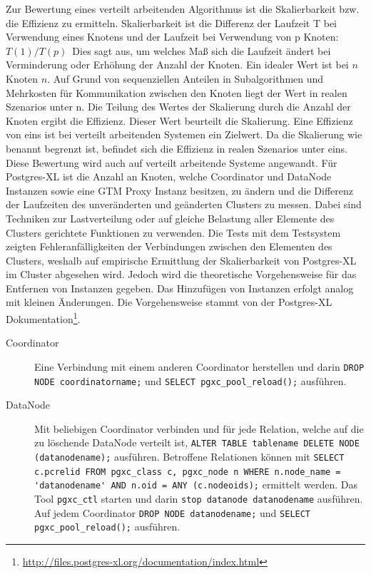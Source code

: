 Zur Bewertung eines verteilt arbeitenden Algorithmus ist die Skalierbarkeit bzw. die Effizienz zu ermitteln.
Skalierbarkeit ist die Differenz der Laufzeit T bei Verwendung eines Knotens und der Laufzeit bei Verwendung von p Knoten:
$T(1)/T(p)$\ 
Dies sagt aus, um welches Maß sich die Laufzeit ändert bei Verminderung oder Erhöhung der Anzahl der Knoten.
Ein idealer Wert ist bei $n$ Knoten $n$.
Auf Grund von sequenziellen Anteilen in Subalgorithmen und Mehrkosten für Kommunikation zwischen den Knoten liegt der Wert in realen Szenarios unter n.
Die Teilung des Wertes der Skalierung durch die Anzahl der Knoten ergibt die Effizienz.
Dieser Wert beurteilt die Skalierung.
Eine Effizienz von eins ist bei verteilt arbeitenden Systemen ein Zielwert.
Da die Skalierung wie benannt begrenzt ist, befindet sich die Effizienz in realen Szenarios unter eins.\\
Diese Bewertung wird auch auf verteilt arbeitende Systeme angewandt.
Für Postgres-XL ist die Anzahl an Knoten, welche Coordinator und DataNode Instanzen sowie eine GTM Proxy Instanz besitzen, zu ändern und die Differenz der Laufzeiten des unveränderten und geänderten Clusters zu messen.
Dabei sind Techniken zur Lastverteilung oder auf gleiche Belastung aller Elemente des Clusters gerichtete Funktionen zu verwenden.
Die Tests mit dem Testsystem zeigten Fehleranfälligkeiten der Verbindungen zwischen den Elementen des Clusters, weshalb auf empirische Ermittlung der Skalierbarkeit von Postgres-XL im Cluster abgesehen wird.
Jedoch wird die theoretische Vorgehensweise für das Entfernen von Instanzen gegeben.
Das Hinzufügen von Instanzen erfolgt analog mit kleinen Änderungen.
Die Vorgehensweise stammt von der Postgres-XL Dokumentation\footnote{\url{http://files.postgres-xl.org/documentation/index.html}}.
\begin{description}
\item[Coordinator] Eine Verbindung mit einem anderen Coordinator herstellen und darin \verb+DROP NODE coordinatorname;+ und \verb+SELECT pgxc_pool_reload();+ ausführen.
\item[DataNode] Mit beliebigen Coordinator verbinden und für jede Relation, welche auf die zu löschende DataNode verteilt ist, \verb+ALTER TABLE tablename DELETE NODE+\\\verb+(datanodename);+ ausführen. Betroffene Relationen können mit \verb+SELECT+\\\verb+c.pcrelid FROM pgxc_class c, pgxc_node n WHERE n.node_name =+\\\verb+'datanodename' AND n.oid = ANY (c.nodeoids);+ ermittelt werden. Das Tool \verb+pgxc_ctl+ starten und darin \verb+stop datanode datanodename+ ausführen. Auf jedem Coordinator \verb+DROP NODE datanodename;+ und \verb+SELECT+\\\verb+pgxc_pool_reload();+ ausführen.
\end{description}

